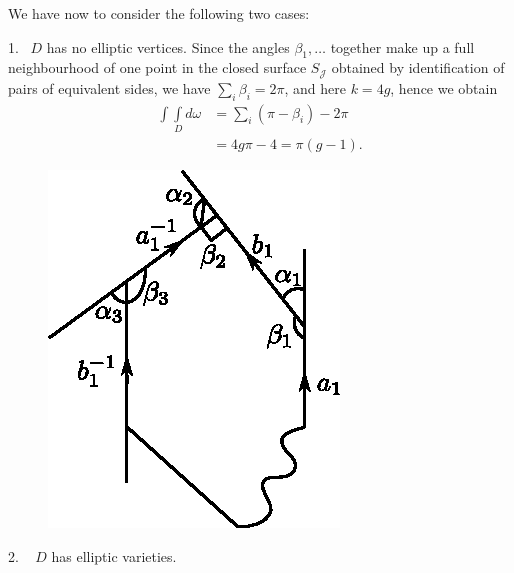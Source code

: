 We have now to consider the following two cases:


1.~ $D$ has no elliptic vertices.  Since the angles $\beta_1,  \ldots
  $ together make up a full neighbourhood of one point in the closed
  surface $S_\mathcal{J}$ obtained by identification of pairs of
  equivalent sides, we have $\sum\limits_i \beta_i = 2 \pi$, and here
  $k = 4  g$, hence we obtain   
  \begin{align*}[H]
    \int \int\limits_D d \omega &= \sum_i (\pi - \beta _i)- 2 \pi \\
    & = 4 g \pi - 4 = \pi (g - 1). 
  \end{align*}

  \begin{figure}[H]
    \centerline{\includegraphics{vol9-figures/fig9-6.eps}}
  \end{figure}

2. ~ $D$ has elliptic varieties. 

